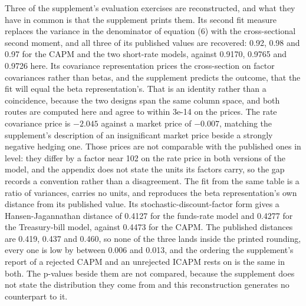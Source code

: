 \documentclass[11pt]{article}
\begin{document}
Three of the supplement's evaluation exercises are reconstructed, and what they
have in common is that the supplement prints them. Its second fit measure
replaces the variance in the denominator of equation (6) with the cross-sectional %
second moment, and all three of its published values are recovered: 0.92, 0.98 %
and 0.97 for the CAPM and the two short-rate models, against 0.9170, 0.9765 %
and 0.9726 here. %
Its covariance representation prices the cross-section on factor covariances
rather than betas, and the supplement predicts the outcome, that the fit will
equal the beta representation's. That is an identity rather than a coincidence,
because the two designs span the same column space, and both routes are computed
here and agree to within 3e-14 on the prices. The rate covariance price is %
$-2.045$ against a market price of $-0.007$, matching the supplement's %
description of an insignificant market price beside a strongly negative hedging
one. Those prices are not comparable with the published ones in level: they differ
by a factor near 102 on the rate price in both versions of the model, and the %
appendix does not state the units its factors carry, so the gap records a
convention rather than a disagreement. The fit from the same table is a ratio of
variances, carries no units, and reproduces the beta representation's own
distance from its published value. Its stochastic-discount-factor form gives a Hansen-Jagannathan distance of
0.4127 for the funds-rate model and 0.4277 for the Treasury-bill model, against %
0.4473 for the CAPM. The published distances are 0.419, 0.437 and 0.460, so %
none of the three lands inside the printed rounding, every one is low by between %
0.006 and 0.013, and the ordering the supplement's report of a rejected CAPM and %
an unrejected ICAPM rests on is the same in both. The p-values beside them are
not compared, because the supplement does not state the distribution they come
from and this reconstruction generates no counterpart to it.
\end{document}
